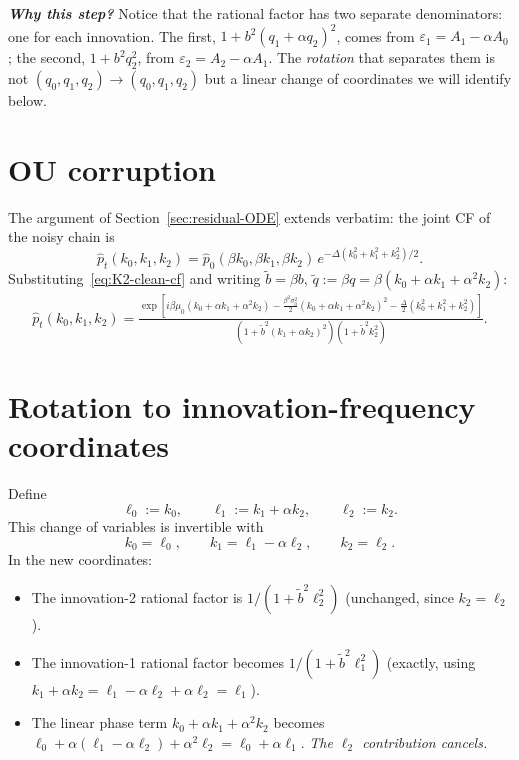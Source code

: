\documentclass[11pt,a4paper,openany]{book}
\theoremstyle{plainserif}
\theoremstyle{definition}
\theoremstyle{remarkstyle}
\newenvironment{whybox}{%
  \begin{center}\begin{minipage}{0.95\linewidth}\small
  \textbf{\textit{Why this step?}}\quad\ignorespaces}{%
  \end{minipage}\end{center}}
\newcommand{\btilde}{\tilde{b}}
\newcommand{\hatfn}[1]{\widehat{#1}}
\begin{document}
\begin{whybox}
Notice that the rational factor has two separate denominators: one for
each innovation. The first, $1 + b^2(q_1 + \alpha q_2)^2$, comes from
$\varepsilon_1 = A_1 - \alpha A_0$; the second, $1 + b^2 q_2^2$, from
$\varepsilon_2 = A_2 - \alpha A_1$. The \emph{rotation} that separates
them is not $(q_0, q_1, q_2) \to (q_0, q_1, q_2)$ but a linear change of
coordinates we will identify below.
\end{whybox}

\section{OU corruption}

The argument of Section~\ref{sec:residual-ODE} extends verbatim:
the joint CF of the noisy chain is
\begin{equation}
\hatfn p_t(k_0, k_1, k_2) = \hatfn p_0(\beta k_0, \beta k_1, \beta k_2)\,
    e^{-\Delta(k_0^2 + k_1^2 + k_2^2)/2}.
\end{equation}
Substituting~\eqref{eq:K2-clean-cf} and writing $\btilde = \beta b$,
$\tilde q := \beta q = \beta(k_0 + \alpha k_1 + \alpha^2 k_2)$:
\begin{align}
\hatfn p_t(k_0, k_1, k_2) =
\frac{\exp\!\left[i\beta\mu_0(k_0+\alpha k_1+\alpha^2 k_2)
       - \tfrac{\beta^2\sigma_0^2}{2}(k_0+\alpha k_1+\alpha^2 k_2)^2
       - \tfrac{\Delta}{2}(k_0^2+k_1^2+k_2^2)\right]}
     {(1 + \btilde^2(k_1+\alpha k_2)^2)(1 + \btilde^2 k_2^2)}.
\label{eq:K2-fourier-original}
\end{align}

\section{Rotation to innovation-frequency coordinates}

Define
\begin{equation}
\ell_0 := k_0,\qquad
\ell_1 := k_1 + \alpha k_2,\qquad
\ell_2 := k_2.
\label{eq:ell-rotation-K2}
\end{equation}
This change of variables is invertible with
\begin{equation}
k_0 = \ell_0,\qquad
k_1 = \ell_1 - \alpha\ell_2,\qquad
k_2 = \ell_2.
\end{equation}
In the new coordinates:

\begin{itemize}[leftmargin=2em, topsep=3pt]
\item The innovation-2 rational factor is $1/(1 + \btilde^2 \ell_2^2)$
(unchanged, since $k_2 = \ell_2$).
\item The innovation-1 rational factor becomes
$1/(1 + \btilde^2 \ell_1^2)$ (exactly, using
$k_1 + \alpha k_2 = \ell_1 - \alpha\ell_2 + \alpha\ell_2 = \ell_1$).
\item The linear phase term $k_0 + \alpha k_1 + \alpha^2 k_2$ becomes
$\ell_0 + \alpha(\ell_1 - \alpha\ell_2) + \alpha^2\ell_2 = \ell_0 + \alpha\ell_1$.
\emph{The $\ell_2$ contribution cancels.}
\end{itemize}
\end{document}
